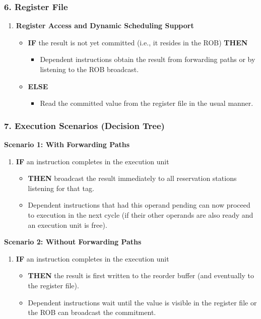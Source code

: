 {  \subsubsection*{6. Register File}
  \vspace{-5px}
  \begin{enumerate}
      \item \textbf{Register Access and Dynamic Scheduling Support}
      \begin{itemize}
          \item \textbf{IF} the result is not yet committed (i.e., it resides in the ROB) \textbf{THEN}
          \begin{itemize}
              \item Dependent instructions obtain the result from forwarding paths or by listening to the ROB broadcast.
          \end{itemize}
          \item \textbf{ELSE}
          \begin{itemize}
              \item Read the committed value from the register file in the usual manner.
          \end{itemize}
      \end{itemize}
  \end{enumerate}
  \vspace{-15px}
  \subsubsection*{7. Execution Scenarios (Decision Tree)}
  \vspace{-5px}
  \noindent
  \textbf{Scenario 1: With Forwarding Paths}
  \begin{enumerate}
      \item \textbf{IF} an instruction completes in the execution unit
      \begin{itemize}
          \item \textbf{THEN} broadcast the result immediately to all reservation stations listening for that tag.
          \item Dependent instructions that had this operand pending can now proceed to execution in the next cycle (if their other operands are also ready and an execution unit is free).
      \end{itemize}
  \end{enumerate}
  \noindent
  \textbf{Scenario 2: Without Forwarding Paths}
  \begin{enumerate}
      \item \textbf{IF} an instruction completes in the execution unit
      \begin{itemize}
          \item \textbf{THEN} the result is first written to the reorder buffer (and eventually to the register file).
          \item Dependent instructions wait until the value is visible in the register file or the ROB can broadcast the commitment.
      \end{itemize}
  \end{enumerate}

}
